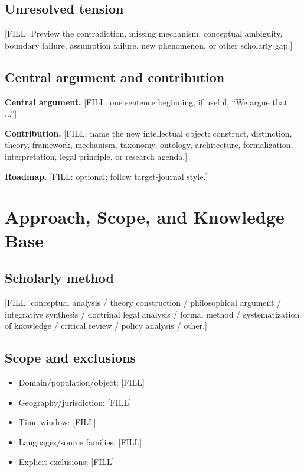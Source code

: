\documentclass[11pt]{article}
\begin{document}
\subsection{Unresolved tension}
[FILL: Preview the contradiction, missing mechanism, conceptual ambiguity,
boundary failure, assumption failure, new phenomenon, or other scholarly gap.]

\subsection{Central argument and contribution}
\noindent\textbf{Central argument.}
[FILL: one sentence beginning, if useful, ``We argue that ...'']

\noindent\textbf{Contribution.}
[FILL: name the new intellectual object: construct, distinction, theory,
framework, mechanism, taxonomy, ontology, architecture, formalization,
interpretation, legal principle, or research agenda.]

\noindent\textbf{Roadmap.}
[FILL: optional; follow target-journal style.]


\section{Approach, Scope, and Knowledge Base}
\label{sec:s2}

%

\subsection{Scholarly method}
[FILL: conceptual analysis / theory construction / philosophical argument /
integrative synthesis / doctrinal legal analysis / formal method /
systematization of knowledge / critical review / policy analysis / other.]

\subsection{Scope and exclusions}
\begin{itemize}
  \item Domain/population/object: [FILL]
  \item Geography/jurisdiction: [FILL]
  \item Time window: [FILL]
  \item Languages/source families: [FILL]
  \item Explicit exclusions: [FILL]
\end{itemize}
\end{document}
